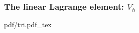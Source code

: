 \begin{frame}
  \frametitle{The linear Lagrange element: $V_h$}

  \begin{center}
    \def\svgwidth{0.8\textwidth}
    {pdf/tri.pdf_tex}
  \end{center}

\end{frame}
